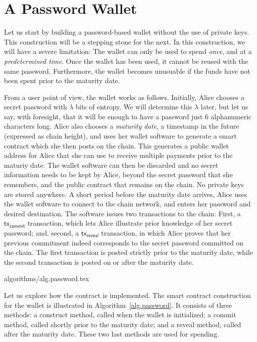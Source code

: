 \section{A Password Wallet}\label{sec:password}

Let us start by building a password-based wallet without the use of private keys.
This construction will be a stepping stone for the next. In this construction, we
will have a severe limitation: The wallet can only be used to spend \emph{once},
and at a \emph{predetermined time}. Once the wallet has been used, it cannot be
reused with the same password. Furthermore, the wallet becomes unusuable if the
funds have not been spent prior to the maturity date.

From a user point of view, the wallet works as follows. Initially, Alice chooses
a secret password with $\lambda$ bits of entropy. We will determine this $\lambda$
later, but let us say, with foresight, that it will be enough to have a password
just $6$ alphanumeric characters long. Alice also chooses a \emph{maturity date},
a timestamp in the future (expressed as chain height),
and uses her wallet software to generate
a smart contract which she then posts on the chain. This generates a public wallet
address for Alice that she can use to receive multiple payments prior to the maturiy date.
The wallet software can then
be discarded and no secret information needs to be kept by Alice, beyond the
secret password that she remembers, and the public contract that remains on the chain.
No private keys are stored anywhere.
A short period before the maturity date arrives,
Alice uses the wallet software to connect to the chain network, and enters her
password and desired destination. The software issues two transactions to the chain:
First, a $\textsf{tx}_\textsf{commit}$ transaction, which lets Alice illustrate prior
knowledge of her secret password; and, second, a $\textsf{tx}_\textsf{reveal}$ transaction,
in which Alice proves that her previous commitment indeed corresponds to the secret
password committed on the chain. The first transaction is posted strictly prior to the maturity
date, while the second transaction is posted on or after the maturity date.

{algorithms/alg.password.tex}

Let us explore how the contract is implemented.
The smart contract construction for the wallet is illustrated in
Algorithm~\ref{alg.password}. It consists of three methods: a \textsf{construct}
method, called when the wallet is initialized; a \textsf{commit} method, called
shortly prior to the maturity date; and a \textsf{reveal} method, called after
the maturity date. These two last methods are used for spending.

